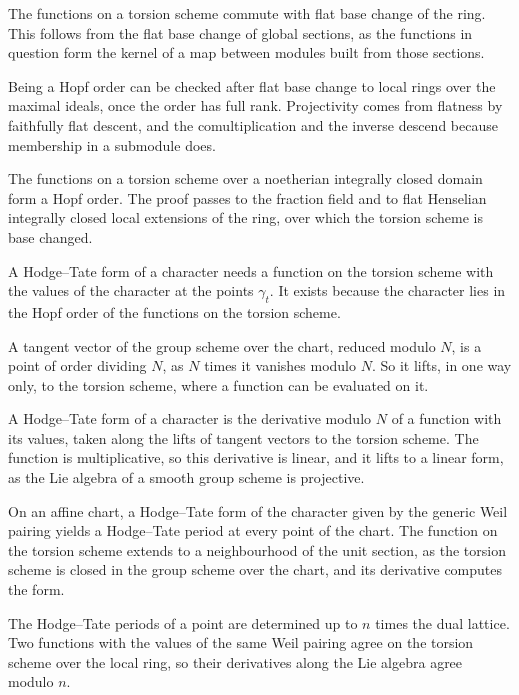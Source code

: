 The functions on a torsion scheme commute with flat base change of the ring. This follows from the flat base change of
global sections, as the functions in question form the kernel of a map between modules built from those sections.

Being a Hopf order can be checked after flat base change to local rings over the maximal ideals, once the order has full
rank. Projectivity comes from flatness by faithfully flat descent, and the comultiplication and the inverse descend
because membership in a submodule does.

The functions on a torsion scheme over a noetherian integrally closed domain form a Hopf order. The proof passes to the
fraction field and to flat Henselian integrally closed local extensions of the ring, over which the torsion scheme is base
changed.

A Hodge--Tate form of a character needs a function on the torsion scheme with the values of the character at the points
$\gamma_t$. It exists because the character lies in the Hopf order of the functions on the torsion scheme.

A tangent vector of the group scheme over the chart, reduced modulo $N$, is a point of order dividing $N$, as $N$ times it
vanishes modulo $N$. So it lifts, in one way only, to the torsion scheme, where a function can be evaluated on it.

A Hodge--Tate form of a character is the derivative modulo $N$ of a function with its values, taken along the lifts of
tangent vectors to the torsion scheme. The function is multiplicative, so this derivative is linear, and it lifts to a
linear form, as the Lie algebra of a smooth group scheme is projective.

On an affine chart, a Hodge--Tate form of the character given by the generic Weil pairing yields a Hodge--Tate period at
every point of the chart. The function on the torsion scheme extends to a neighbourhood of the unit section, as the torsion
scheme is closed in the group scheme over the chart, and its derivative computes the form.

The Hodge--Tate periods of a point are determined up to $n$ times the dual lattice. Two functions with the values of the
same Weil pairing agree on the torsion scheme over the local ring, so their derivatives along the Lie algebra agree modulo
$n$.

